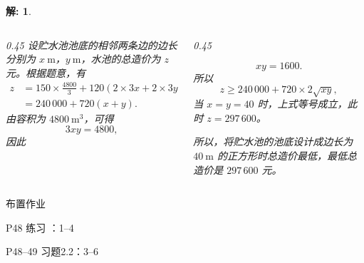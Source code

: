 \documentclass[aspectratio=169,13pt,fleqn] {beamer}
\newtheorem*{solve}{解:}
\begin{document}
\begin{frame}{}
	
	\begin{solve}
		
		\begin{columns}
			\begin{column}{0.45\textwidth}
					设贮水池池底的相邻两条边的边长分别为 $x\ \mathrm{m}$，$y\ \mathrm{m}$，水池的总造价为 $z$ 元。根据题意，有
				\begin{align*}
					z &= 150\times \frac{4800}{3}+120(2\times 3x+2\times 3y) \\
					&= 240\,000+720(x+y).
				\end{align*}
				由容积为 $4800\ \mathrm{m^3}$，可得
				\[
				3xy=4800,
				\]
				因此
			\end{column}
			
			\begin{column}{0.45\textwidth}	
				\begin{tcolorbox}[blanker,%
					frame hidden,
					borderline west={2pt}{-10pt}{xy_orange!60},]
					
					\[
					xy=1600.
					\]
					所以
					\[
					z\ge 240\,000+720\times 2\sqrt{xy},
					\]
					当 $x=y=40$ 时，上式等号成立，此时 $z=297\,600$。
					
					所以，将贮水池的池底设计成边长为 $40\ \mathrm{m}$ 的正方形时总造价最低，最低总造价是 $297\,600$ 元。
				\end{tcolorbox}			
				
			\end{column}
		\end{columns}
	
		
	\end{solve}
\end{frame}




\begin{frame}[t]{布置作业}
	
	P48 练习 ：1--4
	
	P48--49 习题2.2：3--6

\end{frame}
\end{document}
